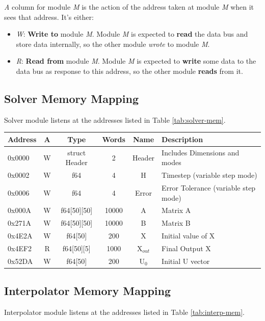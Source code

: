 \documentclass[12pt]{report}
\begin{document}
\emph{A} column for module \emph{M} is the action of the address taken at module \emph{M} when it sees that address. It's either:

\begin{itemize}
    \item \emph{W}: \textbf{Write to} module \emph{M}. Module \emph{M} is expected to \textbf{read} the data bus and store data internally, so the other module \emph{wrote} to module \emph{M}.
    \item \emph{R}: \textbf{Read from} module \emph{M}. Module \emph{M} is expected to \textbf{write} some data to the data bus as response to this address, so the other module \textbf{reads} from it.
\end{itemize}

\subsection{Solver Memory Mapping}
Solver module listens at the addresses listed in Table \ref{tab:solver-mem}.

\begin{center}
 \begin{tabular}{||l| c| c| c| c| l||} 
 \hline
 Address & A & Type & Words & Name & Description  \\ [0.5ex] 
 \hline\hline
  0x0000 & W & struct Header & 2 & Header & Includes Dimensions and modes  \\ 
 \hline
 0x0002  & W & f64 & 4 & H & Timestep (variable step mode)  \\
 \hline
 0x0006  & W & f64 & 4 & Error & Error Tolerance (variable step mode) \\
 \hline
 0x000A  & W & f64[50][50] & 10000 & A & Matrix A \\
 \hline
 0x271A  & W & f64[50][50] & 10000 & B & Matrix B \\
 \hline
 0x4E2A  & W & f64[50] & 200 & X & Initial value of X \\
 \hline
 0x4EF2  & R & f64[50][5] & 1000 & X$_{out}$ & Final Output X \\
 \hline
 0x52DA  & W & f64[50] & 200 & U$_{0}$ & Initial U vector \\
 \hline
\end{tabular}
\end{center}

\subsection{Interpolator Memory Mapping}
Interpolator module listens at the addresses listed in Table \ref{tab:interp-mem}.
\end{document}
